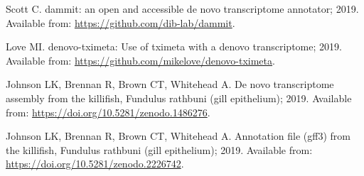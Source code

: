 \documentclass[10pt,letterpaper]{article}
\begin{document}
\begin{thebibliography}{10}
Scott C. dammit: an open and accessible de novo transcriptome annotator; 2019.
\newblock Available from: \url{https://github.com/dib-lab/dammit}.

Love MI. {denovo-tximeta: Use of tximeta with a denovo transcriptome}; 2019.
\newblock Available from: \url{https://github.com/mikelove/denovo-tximeta}.

Johnson LK, Brennan R, Brown CT, Whitehead A. {De novo transcriptome assembly
  from the killifish, Fundulus rathbuni (gill epithelium)}; 2019.
\newblock Available from: \url{https://doi.org/10.5281/zenodo.1486276}.

Johnson LK, Brennan R, Brown CT, Whitehead A. {Annotation file (gff3) from the
  killifish, Fundulus rathbuni (gill epithelium)}; 2019.
\newblock Available from: \url{https://doi.org/10.5281/zenodo.2226742}.

\end{thebibliography}
\end{document}
